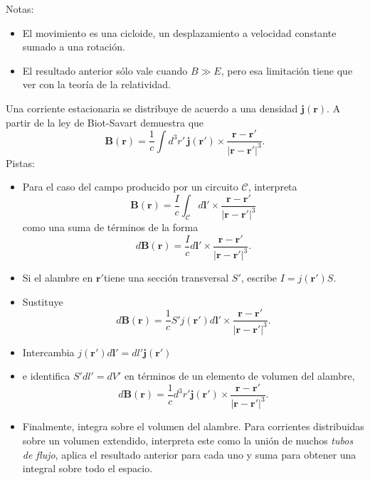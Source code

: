 \documentclass{exam}
\begin{document}
\begin{questions}
    Notas:
    \begin{itemize}
    \item El movimiento es una cicloide, un desplazamiento a velocidad
      constante sumado a una rotación.
    \item El resultado anterior sólo vale cuando $B\gg E$, pero esa
      limitación tiene que ver con la teoría de la relatividad.
    \end{itemize}
  \question Una corriente estacionaria se distribuye de acuerdo a una
    densidad $\bm j(\bm r)$. A partir de la ley de Biot-Savart
    demuestra que
    $$
    \bm B(\bm r)=\frac{1}{c}\int d^3r'\,\bm j(\bm r')\times\frac{\bm
      r-\bm r'}{|\bm r-\bm r'|^3}.
    $$
    Pistas:
    \begin{itemize}
    \item Para el caso del campo producido por un circuito $\mathcal C$, interpreta
      $$
      \bm B(\bm r)=\frac{I}{c}\int_{\mathcal C}d\bm l'\times \frac{\bm
        r-\bm r'}{|\bm r-\bm r'|^3}
      $$
      como una suma de términos de la forma
      $$
      d \bm B(\bm r)=\frac{I}{c} d\bm l'\times \frac{\bm
        r-\bm r'}{|\bm r-\bm r'|^3}.
      $$
    \item Si el alambre en $\bm r'$tiene una sección transversal $S'$, escribe
      $I=j(\bm r')S$.
    \item Sustituye
      $$
      d \bm B(\bm r)=\frac{1}{c} S' j(\bm r') d\bm l'\times \frac{\bm
        r-\bm r'}{|\bm r-\bm r'|^3}.
      $$
    \item Intercambia $j(\bm r') d\bm l'=dl'\bm j(\bm r')$
    \item e identifica $S' dl'=dV'$ en términos de un elemento de
      volumen del alambre,
      $$
      d \bm B(\bm r)=\frac{1}{c} d^3r' \bm j(\bm r') \times \frac{\bm
        r-\bm r'}{|\bm r-\bm r'|^3}.
      $$
    \item Finalmente, integra sobre el volumen del alambre. Para
      corrientes distribuidas sobre un volumen extendido, interpreta
      este como la unión de muchos {\em tubos de flujo}, aplica el
      resultado anterior para cada uno y suma para obtener una
      integral sobre todo el espacio.
    \end{itemize}

\end{questions}
\end{document}
